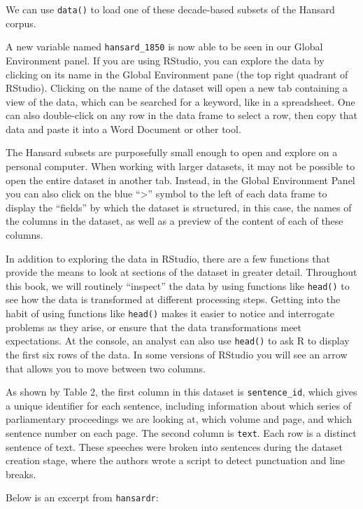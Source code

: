 \documentclass[
]{article}
\begin{document}
We can use \texttt{data()} to load one of these decade-based subsets of
the Hansard corpus.

A new variable named \texttt{hansard\_1850} is now able to be seen in
our Global Environment panel. If you are using RStudio, you can explore
the data by clicking on its name in the Global Environment pane (the top
right quadrant of RStudio). Clicking on the name of the dataset will
open a new tab containing a view of the data, which can be searched for
a keyword, like in a spreadsheet. One can also double-click on any row
in the data frame to select a row, then copy that data and paste it into
a Word Document or other tool.

The Hansard subsets are purposefully small enough to open and explore on
a personal computer. When working with larger datasets, it may not be
possible to open the entire dataset in another tab. Instead, in the
Global Environment Panel you can also click on the blue
``\textgreater{}'' symbol to the left of each data frame to display the
``fields'' by which the dataset is structured, in this case, the names
of the columns in the dataset, as well as a preview of the content of
each of these columns.

In addition to exploring the data in RStudio, there are a few functions
that provide the means to look at sections of the dataset in greater
detail. Throughout this book, we will routinely ``inspect'' the data by
using functions like \texttt{head()} to see how the data is transformed
at different processing steps. Getting into the habit of using functions
like \texttt{head()} makes it easier to notice and interrogate problems
as they arise, or ensure that the data transformations meet
expectations. At the console, an analyst can also use \texttt{head()} to
ask R to display the first six rows of the data. In some versions of
RStudio you will see an arrow that allows you to move between two
columns.

As shown by Table 2, the first column in this dataset is
\texttt{sentence\_id}, which gives a unique identifier for each
sentence, including information about which series of parliamentary
proceedings we are looking at, which volume and page, and which sentence
number on each page. The second column is \texttt{text}. Each row is a
distinct sentence of text. These speeches were broken into sentences
during the dataset creation stage, where the authors wrote a script to
detect punctuation and line breaks.

Below is an excerpt from \texttt{hansardr}:
\end{document}
